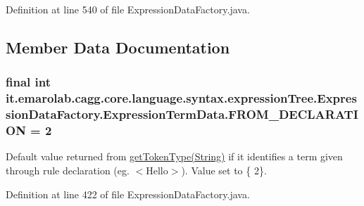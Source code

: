 Definition at line 540 of file Expression\-Data\-Factory.\-java.



\subsection{Member Data Documentation}
\hypertarget{classit_1_1emarolab_1_1cagg_1_1core_1_1language_1_1syntax_1_1expressionTree_1_1ExpressionDataFactory_1_1ExpressionTermData_ab7b629b4ac570eba986cfb0ed8ca3b48}{
\subsubsection[{F\-R\-O\-M\-\_\-\-D\-E\-C\-L\-A\-R\-A\-T\-I\-O\-N}]{\setlength{\rightskip}{0pt plus 5cm}final int it.\-emarolab.\-cagg.\-core.\-language.\-syntax.\-expression\-Tree.\-Expression\-Data\-Factory.\-Expression\-Term\-Data.\-F\-R\-O\-M\-\_\-\-D\-E\-C\-L\-A\-R\-A\-T\-I\-O\-N = 2\hspace{0.3cm}{\ttfamily [static]}}}\label{classit_1_1emarolab_1_1cagg_1_1core_1_1language_1_1syntax_1_1expressionTree_1_1ExpressionDataFactory_1_1ExpressionTermData_ab7b629b4ac570eba986cfb0ed8ca3b48}
Default value returned from \hyperlink{classit_1_1emarolab_1_1cagg_1_1core_1_1language_1_1syntax_1_1expressionTree_1_1ExpressionDataFactory_1_1ExpressionTermData_ace7d61d502db7ff1a402ac0e6e983e0a}{get\-Token\-Type(\-String)} if it identifies a term given through rule declaration (eg. $<$Hello$>$). Value set to \{ 2\}. 

Definition at line 422 of file Expression\-Data\-Factory.\-java.

